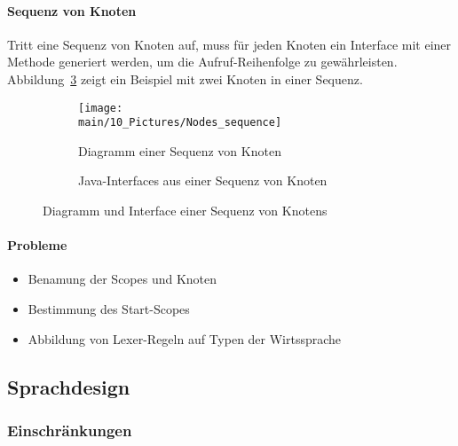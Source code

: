 \documentclass[../InterneDSLs.tex]{subfiles}
\begin{document}
\paragraph{Sequenz von Knoten}
Tritt eine Sequenz von Knoten auf, muss für jeden Knoten ein Interface mit einer Methode generiert werden, um die Aufruf-Reihenfolge zu gewährleisten. Abbildung~\ref{FIG:SequenceNode} zeigt ein Beispiel mit zwei Knoten in einer Sequenz.
\begin{figure}[ht]
\centering
  \begin{subfigure}[c]{0.49\textwidth}
    \texttt{[image: \\main/10\_Pictures/Nodes\_sequence]}
    \caption{Diagramm einer Sequenz von Knoten}
    \label{FIG:DiagramSequenceNode}
  \end{subfigure}
  \begin{subfigure}[c]{0.49\textwidth}
    
    \caption{Java-Interfaces aus einer Sequenz von Knoten}
    \label{FIG:JInterfaceSequenceNode}
  \end{subfigure}
  \caption{Diagramm und Interface einer Sequenz von Knotens}
  \label{FIG:SequenceNode}
\end{figure}

\paragraph{Probleme}
\begin{itemize}
	\item Benamung der Scopes und Knoten
	\item Bestimmung des Start-Scopes
	\item Abbildung von Lexer-Regeln auf Typen der Wirtssprache
\end{itemize}


\subsection{Sprachdesign}


\subsubsection{Einschränkungen}
\end{document}
